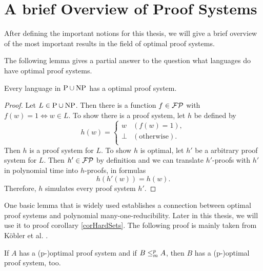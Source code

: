 \chapter{A brief Overview of Proof Systems}
  After defining the important notions for this thesis, we will give a brief overview of the most important results in the field of optimal proof systems.

  The following lemma gives a partial answer to the question what languages do have optimal proof systems.

  \begin{lemma}
   Every language in \(\text{P} \cup \text{NP}\) has a optimal proof system.
  \end{lemma}

  \begin{proof}
    Let \(L \in \text{P} \cup \text{NP}\). Then there is a function \(f \in \mathcal{FP}\) with \(f(w) = 1 \Leftrightarrow w \in L\). To show there is a proof system, let \(h\) be defined by
    \[
      h(w) =
      \begin{cases}
        w & (f(w) = 1), \\
        \perp & (\text{otherwise}). \\
      \end{cases}
    \]
    Then \(h\) is a proof system for \(L\). To show \(h\) is optimal, let \(h'\) be a arbitrary proof system for \(L\). Then \(h' \in \mathcal{FP}\) by definition and we can translate \(h'\)-proofs with \(h'\) in polynomial time into \(h\)-proofs, in formulas
    \[
      h(h'(w)) = h(w).
    \]
    Therefore, \(h\) simulates every proof system \(h'\).
  \end{proof}

  One basic lemma that is widely used establishes a connection between optimal proof systems and polynomial many-one-reducibility. Later in this thesis, we will use it to proof corollary \ref{corHardSets}. The following proof is mainly taken from Köbler et al. \cite{KMT03}.

  \begin{lemma}
    If \(A\) has a (p-)optimal proof system and if \(B \leq_{m}^{p} A\), then \(B\) has a (p-)optimal proof system, too.
  \end{lemma}

